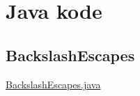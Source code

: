 \chapter{Java kode}

\section{BackslashEscapes}
\label{BackslashEscapes}

\underline{BackslashEscapes.java}
\begin{lstlisting}[language=Java]

\end{lstlisting}